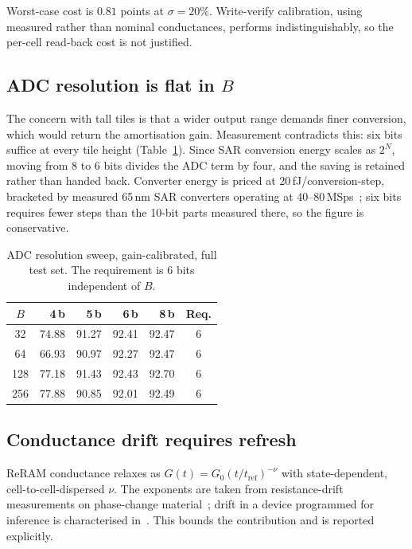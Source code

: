 \documentclass[conference,10pt]{IEEEtran}
\begin{document}
Worst-case cost is $0.81$ points at $\sigma{=}20\%$. Write-verify calibration,
using measured rather than nominal conductances, performs indistinguishably,
so the per-cell read-back cost is not justified.

\subsection{ADC resolution is flat in $B$}

The concern with tall tiles is that a wider output range demands finer
conversion, which would return the amortisation gain. Measurement contradicts
this: six bits suffice at every tile height (Table~\ref{tab:adc}). Since SAR
conversion energy scales as $2^{N}$, moving from 8 to 6 bits divides the ADC
term by four, and the saving is retained rather than handed back. Converter
energy is priced at 20\,fJ/conversion-step, bracketed by measured 65\,nm SAR
converters operating at 40--80\,MSps~\cite{firlej2024}; six bits requires fewer
steps than the 10-bit parts measured there, so the figure is conservative.

\begin{table}[t]
\centering
\caption{ADC resolution sweep, gain-calibrated, full test set. The requirement
is 6 bits independent of $B$.}
\label{tab:adc}
\begin{tabular}{crrrrc}
\toprule
$B$ & 4\,b & 5\,b & 6\,b & 8\,b & Req. \\
\midrule
32  & 74.88 & 91.27 & 92.41 & 92.47 & 6 \\
64  & 66.93 & 90.97 & 92.27 & 92.47 & 6 \\
128 & 77.18 & 91.43 & 92.43 & 92.70 & 6 \\
256 & 77.88 & 90.85 & 92.01 & 92.49 & 6 \\
\bottomrule
\end{tabular}
\end{table}

\subsection{Conductance drift requires refresh}

ReRAM conductance relaxes as $G(t){=}G_0(t/t_{\mathrm{ref}})^{-\nu}$ with
state-dependent, cell-to-cell-dispersed $\nu$. The exponents are taken from
resistance-drift measurements on phase-change material~\cite{pries2022}; drift
in a device programmed for inference is characterised
in~\cite{joshi2020}. This bounds the contribution and
is reported explicitly.
\end{document}
